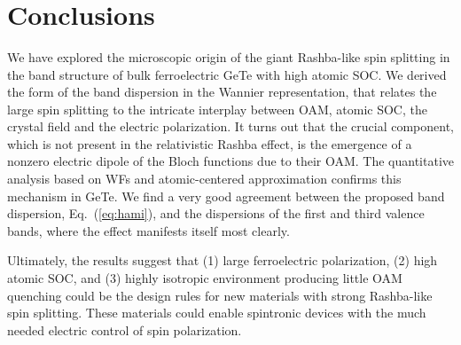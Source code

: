 \begin{figure*}[t!]
  ~
  \\
  ~
  ~
  \\
  ~
  ~
  \caption{\label{fig:Rashba_textures}{\bf OAM and SAM in the BZ.} The textures of BFs around the $Z$ point are shown for the first and third valence bands of GeTe. The black and green arrows show the OAM and SAM textures, respectively. The length of the arrows was chosen separately for clarity in each figure and should thus not be compared. The color maps signify the energy of the bands, relative to the Fermi level. The small box around the $Z$ point indicates the area, magnified in panels (c) and (f). In the zoomed figures (c) and (f) one can observe the change or relative orientation between the SAM and OAM when moving away from the $Z$ point, signifying a change of character between $j=1/2$ and $j=3/2$. Figure taken from Ref.~\cite{Ponet2018}}
\end{figure*}

\section{Conclusions}

We have explored the microscopic origin of the giant Rashba-like spin splitting in the band structure of bulk ferroelectric GeTe with high atomic SOC. We derived the form of the band dispersion in the Wannier representation, that relates the large spin splitting to the intricate interplay between OAM, atomic SOC, the crystal field and the electric polarization. It turns out that the crucial component, which is not present in the relativistic Rashba effect, is the emergence of a nonzero electric dipole of the Bloch functions due to their OAM. The quantitative analysis based on WFs and atomic-centered approximation confirms this mechanism in GeTe. We find a very good agreement between the proposed band dispersion, Eq.~(\ref{eq:hami}), and the dispersions of the first and third valence bands, where the effect manifests itself most clearly.

Ultimately, the results suggest that (1) large ferroelectric polarization, (2) high atomic SOC, and (3) highly isotropic environment producing little OAM quenching could be the design rules for new materials with strong Rashba-like spin splitting. These materials could enable spintronic devices with the much needed electric control of spin polarization.
